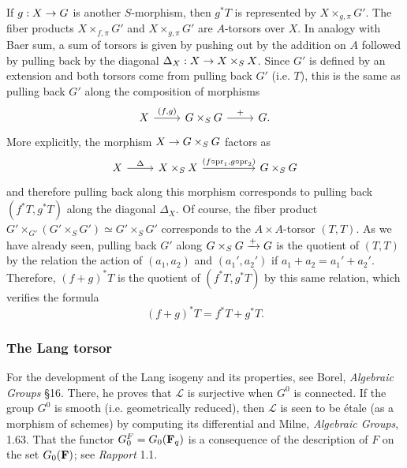 \documentclass[deligne.tex]{subfiles}
\begin{document}
If $g:X\rightarrow G$ is another $S$-morphism, then $g^*T$ is represented by
$X\times_{g,\pi} G'$.
The fiber products $X\times_{f,\pi} G'$ and $X\times_{g,\pi} G'$
are $A$-torsors over $X$. In analogy with Baer sum, a sum of torsors is
given by pushing out by the addition on $A$ followed by pulling back by the
diagonal $\Delta_X:X\rightarrow X\times_S X$. Since $G'$ is defined by
an extension and both torsors come from pulling back $G'$ (i.e. $T$),
this is the same as pulling back $G'$ along the composition of morphisms
\begin{equation*}\begin{tikzcd}
	X\arrow[r,"{(f,g)}"]&G\times_S G\arrow[r,"+"]&G.
\end{tikzcd}\end{equation*}
More explicitly, the morphism $X\rightarrow G\times_S G$ factors as
\begin{equation*}\begin{tikzcd}
	X\arrow[r,"\Delta"]&X\times_S X\arrow[rr,"{(f\circ\pr_1,g\circ\pr_2)}"]&&G\times_S G
\end{tikzcd}\end{equation*}
and therefore pulling back along this morphism corresponds to pulling back
$(f^*T,g^*T)$ along the diagonal $\Delta_X$.
Of course, the fiber product $G'\times_{G'}(G'\times_S G')\simeq G'\times_S G'$
corresponds to the $A\times A$-torsor $(T,T)$.
As we have already seen, pulling back $G'$ along $G\times_S G\xrightarrow{+} G$
is the quotient of $(T,T)$ by the relation the action of $(a_1,a_2)$ and
$(a_1',a_2')$ if $a_1+a_2=a_1'+a_2'$. Therefore, $(f+g)^*T$ is the quotient
of $(f^*T,g^*T)$ by this same relation, which verifies the formula 
\begin{equation*} (f+g)^*T=f^*T+g^*T. \end{equation*}

\subsubsection*{The Lang torsor}
For the development of the Lang isogeny and its properties, see
Borel, \emph{Algebraic Groups} \S16. There, he proves that $\mathscr L$ is
surjective when $G^0$ is connected.
If the group $G^0$ is smooth (i.e. geometrically reduced), then $\mathscr L$
is seen to be étale (as a morphism of schemes) by computing its differential
and Milne, \emph{Algebraic Groups}, 1.63.
That the functor $G_0^F=G_0(\mathbf{F}_q)$ is a consequence of the description of
$F$ on the set $G_0(\mathbf{F})$; see \emph{Rapport} 1.1.
\end{document}
